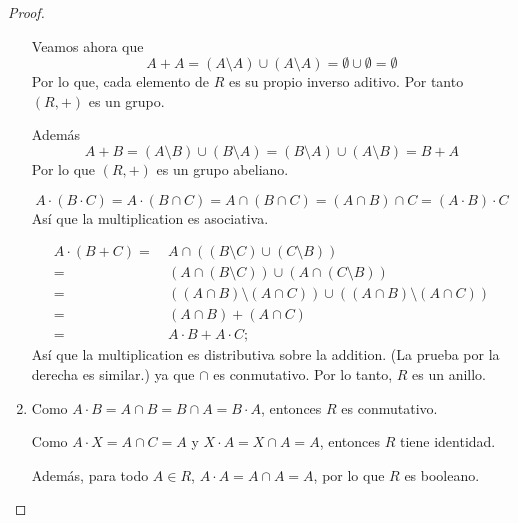 \documentclass{amsart}
\begin{document}
\begin{proof}
\begin{enumerate}
        Veamos ahora que
        $$ A + A = (A \setminus A) \cup (A \setminus A) = \emptyset \cup \emptyset = \emptyset$$
        Por lo que, cada elemento de $R$ es su propio inverso aditivo. Por tanto $(R,+)$ es un grupo.

        Además 
        $$ A + B = (A \setminus B) \cup (B \setminus A) = (B \setminus A) \cup (A \setminus B) = B + A $$
        Por lo que $(R, +)$ es un grupo abeliano.

        $$ A \cdot (B \cdot C) = A \cdot (B \cap C ) = A \cap (B \cap C) = (A \cap B) \cap C = (A \cdot B) \cdot C $$
        Así que la multiplication es asociativa.

        \begin{align*}
            A \cdot (B + C) =&\ A \cap ((B \setminus C) \cup (C \setminus B))\\
            =&\ (A \cap (B \setminus C)) \cup (A \cap (C \setminus B))\\
            =&\ ((A \cap B) \setminus (A \cap C)) \cup ((A \cap B) \setminus (A \cap C))\\
            =&\ (A \cap B) + (A \cap C) \\
            =&\ A \cdot B + A \cdot C;
        \end{align*}
        Así que la multiplication es distributiva sobre la addition. (La prueba por la derecha es similar.) ya que $\cap$ es conmutativo. Por lo tanto, $R$ es un anillo.
        
        \item Como $A\cdot B = A \cap B = B \cap A = B \cdot A$, entonces $R$ es conmutativo.
        
        Como $A \cdot X = A \cap C = A$ y $X \cdot A = X \cap A = A$, entonces $R$ tiene identidad.

        Además, para todo $A \in R$, $A \cdot A = A \cap A = A$, por lo que $R$ es booleano.
    \end{enumerate}
\end{proof}
\end{document}
